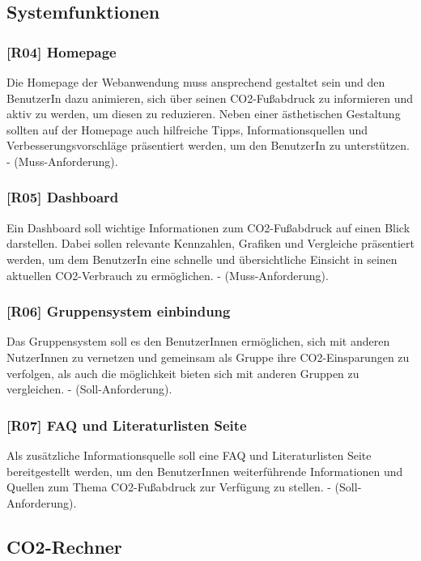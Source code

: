 \subsection{Systemfunktionen}

\subsubsection{[R04] Homepage}

Die Homepage der Webanwendung muss ansprechend gestaltet sein und den BenutzerIn dazu animieren, sich über seinen CO2-Fußabdruck zu informieren und aktiv zu werden, um diesen zu reduzieren. Neben einer ästhetischen Gestaltung sollten auf der Homepage auch hilfreiche Tipps, Informationsquellen und Verbesserungsvorschläge präsentiert werden, um den BenutzerIn zu unterstützen. - (Muss-Anforderung).

\subsubsection{[R05] Dashboard}

Ein Dashboard soll wichtige Informationen zum CO2-Fußabdruck auf einen Blick darstellen. Dabei sollen relevante Kennzahlen, Grafiken und Vergleiche präsentiert werden, um dem BenutzerIn eine schnelle und übersichtliche Einsicht in seinen aktuellen CO2-Verbrauch zu ermöglichen. - (Muss-Anforderung).

\subsubsection{[R06] Gruppensystem einbindung}

Das Gruppensystem soll es den BenutzerInnen ermöglichen, sich mit anderen NutzerInnen zu vernetzen und gemeinsam als Gruppe ihre CO2-Einsparungen zu verfolgen, als auch die möglichkeit bieten sich mit anderen Gruppen zu vergleichen. - (Soll-Anforderung).

\subsubsection{[R07] FAQ und Literaturlisten Seite}

Als zusätzliche Informationsquelle soll eine FAQ und Literaturlisten Seite bereitgestellt werden, um den BenutzerInnen weiterführende Informationen und Quellen zum Thema CO2-Fußabdruck zur Verfügung zu stellen. - (Soll-Anforderung).

\subsection{CO2-Rechner}

